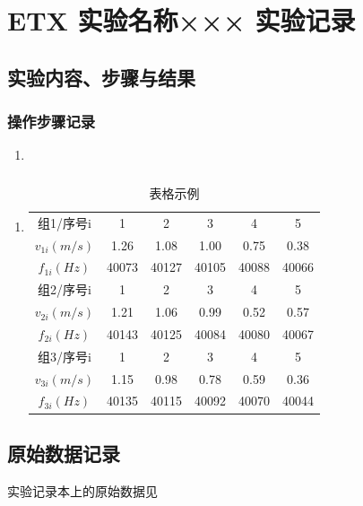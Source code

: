 \documentclass[dvipsnames, svgnames,a4paper,11pt]{article}
\begin{document}
	\section{ETX 实验名称×××  \quad\heiti 实验记录}
	
	\subsection{实验内容、步骤与结果}
	
	\subsubsection{操作步骤记录}
	\begin{enumerate}
		\item 
	\end{enumerate}	
	
	\subsubsection{}
	\begin{enumerate}
		\item \begin{table}[h]
			\centering
			\caption{表格示例}
			\label{tab:tab1}
			\begin{tabular}{|c|c|c|c|c|c|}
				\hline
				组1/序号i & 1 & 2 & 3 & 4 & 5 \\
				$v_{1i}(m/s)$ & 1.26 & 1.08 & 1.00 & 0.75 & 0.38 \\
				$f_{1i}(Hz)$ & 40073 & 40127 & 40105 & 40088 & 40066 \\
				\hline
				组2/序号i & 1 & 2 & 3 & 4 & 5 \\
				$v_{2i}(m/s)$ & 1.21 & 1.06 & 0.99 & 0.52 & 0.57 \\
				$f_{2i}(Hz)$ & 40143 & 40125 & 40084 & 40080 & 40067 \\
				\hline
				组3/序号i & 1 & 2 & 3 & 4 & 5 \\
				$v_{3i}(m/s)$ & 1.15 & 0.98 & 0.78 & 0.59 & 0.36 \\
				$f_{3i}(Hz)$ & 40135 & 40115 & 40092 & 40070 & 40044 \\
				\hline
			\end{tabular}
		\end{table}		
	\end{enumerate}
	
	
	\clearpage
	\subsection{原始数据记录}
	实验记录本上的原始数据见%
	
\end{document}
